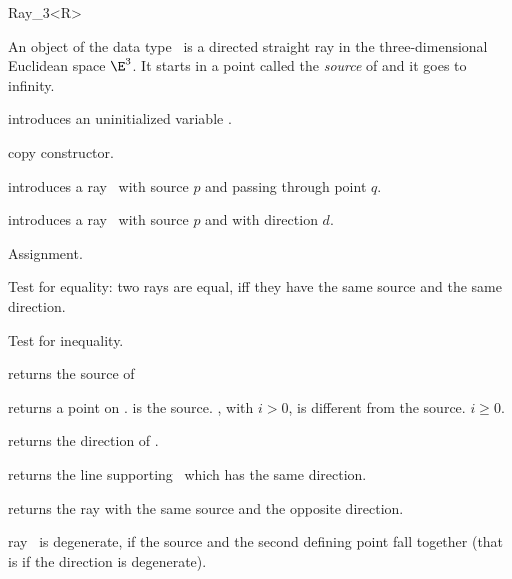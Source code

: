 \begin{ccRefClass} {Ray_3<R>}

\ccDefinition
An object  of the data type \ccRefName\ is a directed
straight ray in the three-dimensional Euclidean space $\E^3$. It starts
in a  point called the {\em source} of   and it goes to infinity.


\ccCreation
{}


\ccHidden {}
             {introduces an uninitialized variable \ccVar.}

\ccHidden {}
 	    {copy constructor.}

            {introduces a ray \ccVar\ 
             with source $p$ and passing through point $q$.}

            {introduces a ray \ccVar\ with source $p$ and with 
             direction $d$.}

\ccOperations

\ccHidden {}
        {Assignment.}

       {Test for equality: two rays are equal, iff they have the same 
        source and the same direction.}

       {Test for inequality.}



       {returns the source of \ccVar}

       {returns a point on \ccVar.  is the source.
        \ccStyle{point(i)}, with $i>0$, is different from the 
        source. \ccPrecond $i \geq 0$.}

       {returns the direction of \ccVar.}

       {returns the line supporting \ccVar\ which has the same direction.}

       {returns the ray with the same source and the opposite direction.}

       {ray \ccVar\ is degenerate, if the source and the second defining
        point fall together (that is if the direction is degenerate).}



\end{ccRefClass}
